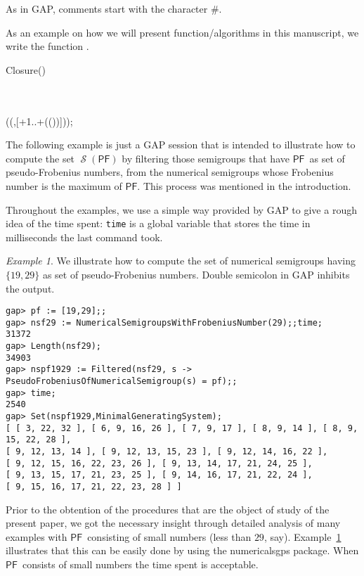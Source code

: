 \documentclass[11pt]{amsart}
\theoremstyle{remark}
\newtheorem{example}[theorem]{Example}
\begin{document}
As in \textsf{GAP}, comments start with the character $\#$.

As an example on how we will present function/algorithms in this manuscript, we write the function \closure.
\begin{function}[ht]\caption{Closure()\label{func:Closure}}
\Closurew{\elts,\frob} \\
\\
\Return \NumericalSemigroup(\Union(\elts,[\frob+1..\frob+\Minimum(\PositiveInt(\elts))]));
\end{function}

The following example is just a \textsf{GAP} session that is intended to illustrate how to compute the set $\operatorname{\mathcal{S}}({\ensuremath{\mathsf{PF}}})$ by filtering those semigroups that have {\ensuremath{\mathsf{PF}}}\ as set of pseudo-Frobenius numbers, from the numerical semigroups whose Frobenius number is the maximum of {\ensuremath{\mathsf{PF}}}. This process was mentioned in the introduction.

Throughout the examples, we use a simple way provided by \textsf{GAP} to give a rough idea of the time spent: \texttt{time} is a global variable that stores the time in milliseconds the last command took.
\begin{example}\label{example:first}
We illustrate how to compute the set of numerical semigroups having $\{19,29\}$ as set of pseudo-Frobenius numbers. Double semicolon in \textsf{GAP} inhibits the output.
\begin{verbatim}
gap> pf := [19,29];;
gap> nsf29 := NumericalSemigroupsWithFrobeniusNumber(29);;time;
31372
gap> Length(nsf29);
34903
gap> nspf1929 := Filtered(nsf29, s -> PseudoFrobeniusOfNumericalSemigroup(s) = pf);;
gap> time;
2540
gap> Set(nspf1929,MinimalGeneratingSystem);                         
[ [ 3, 22, 32 ], [ 6, 9, 16, 26 ], [ 7, 9, 17 ], [ 8, 9, 14 ], [ 8, 9, 15, 22, 28 ], 
[ 9, 12, 13, 14 ], [ 9, 12, 13, 15, 23 ], [ 9, 12, 14, 16, 22 ], 
[ 9, 12, 15, 16, 22, 23, 26 ], [ 9, 13, 14, 17, 21, 24, 25 ], 
[ 9, 13, 15, 17, 21, 23, 25 ], [ 9, 14, 16, 17, 21, 22, 24 ], 
[ 9, 15, 16, 17, 21, 22, 23, 28 ] ]
\end{verbatim}
\end{example}
Prior to the obtention of the procedures that are the object of study of the present paper, we got the necessary insight through detailed analysis of many examples with {\ensuremath{\mathsf{PF}}}\ consisting of small numbers (less than $29$, say).  Example~\ref{example:first} 
illustrates that this can be easily done by using the \textsf{numericalsgps} package. When {\ensuremath{\mathsf{PF}}}\ consists of small numbers the time spent is acceptable. 
\end{document}
